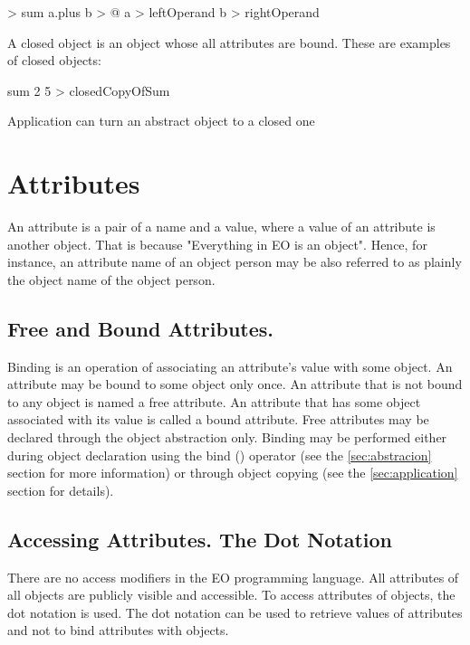 \documentclass[12pt]{book}
\begin{document}
\begin{ffcode}
[a b] > sum
  a.plus b > @
  a > leftOperand
  b > rightOperand
\end{ffcode}
A closed object is an object whose all attributes are bound.
These are examples of closed objects:

\begin{ffcode}
sum 2 5 > closedCopyOfSum
\end{ffcode}
Application can turn an abstract object to a closed one


\section{Attributes}
An attribute is a pair of a name and a value, where a value of an attribute is another object. That is because "Everything in EO is an object". Hence, for instance, an attribute name of an object person may be also referred to as plainly the object name of the object person.

\subsection{Free and Bound Attributes.}
Binding is an operation of associating an attribute's value with some object. An attribute may be bound to some object only once.
An attribute that is not bound to any object is named a free attribute. An attribute that has some object associated with its value is called a bound attribute.
Free attributes may be declared through the object abstraction only. Binding may be performed either during object declaration using the bind (\ff{>}) operator (see the \ref{sec:abstracion} section for more information) or through object copying (see the \ref{sec:application} section for details).

\subsection{Accessing Attributes. The Dot Notation}
There are no access modifiers in the EO programming language. All attributes of all objects are publicly visible and accessible. To access attributes of objects, the dot notation is used. The dot notation can be used to retrieve values of attributes and not to bind attributes with objects.
\end{document}
